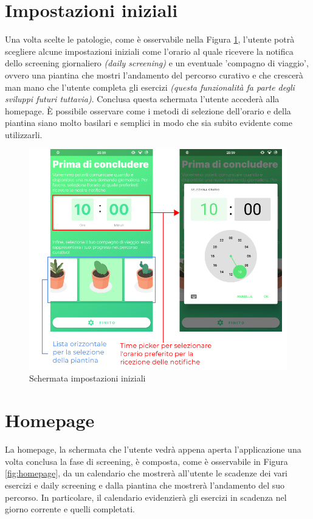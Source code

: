 \newpage
\section{Impostazioni iniziali}
\label{section:impostazioni}
Una volta scelte le patologie, come è osservabile nella Figura \ref{fig:settaggi}, l'utente potrà scegliere alcune impostazioni iniziali come l'orario al quale ricevere la notifica dello screening giornaliero \textit{(daily screening)} e un eventuale 'compagno di viaggio', ovvero una piantina che mostri l'andamento del percorso curativo e che crescerà man mano che l'utente completa gli esercizi \textit{(questa funzionalità fa parte degli sviluppi futuri tuttavia)}. Conclusa questa schermata l'utente accederà alla homepage. È possibile osservare come i metodi di selezione dell'orario e della piantina siano molto basilari e semplici in modo che sia subito evidente come utilizzarli.

\begin{figure}[h!]
\centering
\includegraphics[width=\textwidth]{img/settaggi}
\caption{Schermata impostazioni iniziali}
\label{fig:settaggi}
\end{figure}

\newpage
\section{Homepage}
La homepage, la schermata che l'utente vedrà appena aperta l'applicazione una volta conclusa la fase di screening, è composta, come è osservabile in Figura \ref{fig:homepage}, da un calendario che mostrerà all'utente le scadenze dei vari esercizi e daily screening e dalla piantina che mostrerà l'andamento del suo percorso. In particolare, il calendario evidenzierà gli esercizi in scadenza nel giorno corrente e quelli completati.

